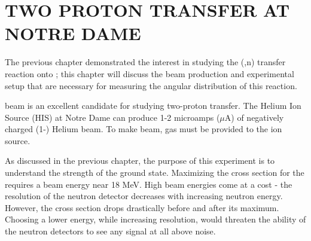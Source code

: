 %
%
%
%
%
%
%
%

%
%

\chapter{TWO PROTON TRANSFER AT NOTRE DAME}
\label{chap:2pExpt}

The previous chapter demonstrated the interest in studying the (,n) transfer reaction onto \GeTargets ; this chapter will discuss the beam production and experimental setup that are necessary for measuring the angular distribution of this reaction.

 beam is an excellent candidate for studying two-proton transfer.  The Helium Ion Source (HIS) at Notre Dame can produce 1-2 microamps ($\mu$A) of negatively charged (1-) Helium beam.  To make  beam,  gas must be provided to the ion source.  

As discussed in the previous chapter, the purpose of this experiment is to understand the strength of the \zp ground state.  Maximizing the \zp cross section for the \reaction requires a beam energy near 18 MeV.  High beam energies come at a cost - the resolution of the neutron detector decreases with increasing neutron energy.  However, the \zp cross section drops drastically before and after its maximum.  Choosing a lower energy, while increasing resolution, would threaten the ability of the neutron detectors to see any signal at all above noise.

